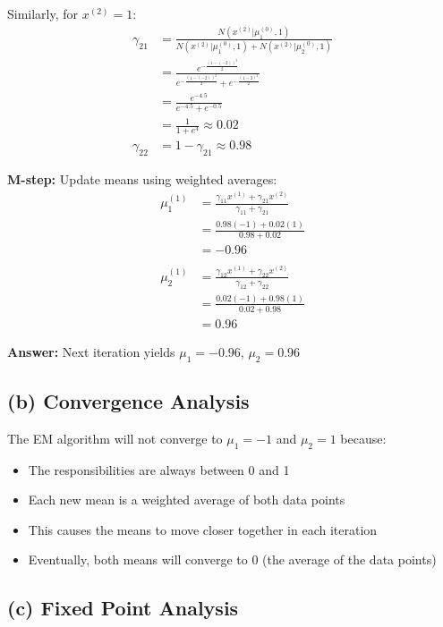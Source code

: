 \documentclass{article}
\begin{document}
Similarly, for $x^{(2)} = 1$:
\begin{align*}
\gamma_{21} &= \frac{N(x^{(2)} | \mu_1^{(0)}, 1)}{N(x^{(2)} | \mu_1^{(0)}, 1) + N(x^{(2)} | \mu_2^{(0)}, 1)} \\
&= \frac{e^{-\frac{(1 - (-2))^2}{2}}}{e^{-\frac{(1 - (-2))^2}{2}} + e^{-\frac{(1 - 2)^2}{2}}} \\
&= \frac{e^{-4.5}}{e^{-4.5} + e^{-0.5}} \\
&= \frac{1}{1 + e^{4}} \approx 0.02 \\
\gamma_{22} &= 1 - \gamma_{21} \approx 0.98
\end{align*}

\textbf{M-step:} Update means using weighted averages:
\begin{align*}
\mu_1^{(1)} &= \frac{\gamma_{11}x^{(1)} + \gamma_{21}x^{(2)}}{\gamma_{11} + \gamma_{21}} \\
&= \frac{0.98(-1) + 0.02(1)}{0.98 + 0.02} \\
&= -0.96 \\
\\
\mu_2^{(1)} &= \frac{\gamma_{12}x^{(1)} + \gamma_{22}x^{(2)}}{\gamma_{12} + \gamma_{22}} \\
&= \frac{0.02(-1) + 0.98(1)}{0.02 + 0.98} \\
&= 0.96
\end{align*}

\textbf{Answer:} Next iteration yields $\mu_1 = -0.96$, $\mu_2 = 0.96$

\subsection*{(b) Convergence Analysis}

The EM algorithm will not converge to $\mu_1 = -1$ and $\mu_2 = 1$ because:

\begin{itemize}
    \item The responsibilities are always between 0 and 1
    \item Each new mean is a weighted average of both data points
    \item This causes the means to move closer together in each iteration
    \item Eventually, both means will converge to 0 (the average of the data points)
\end{itemize}

\subsection*{(c) Fixed Point Analysis}
\end{document}
